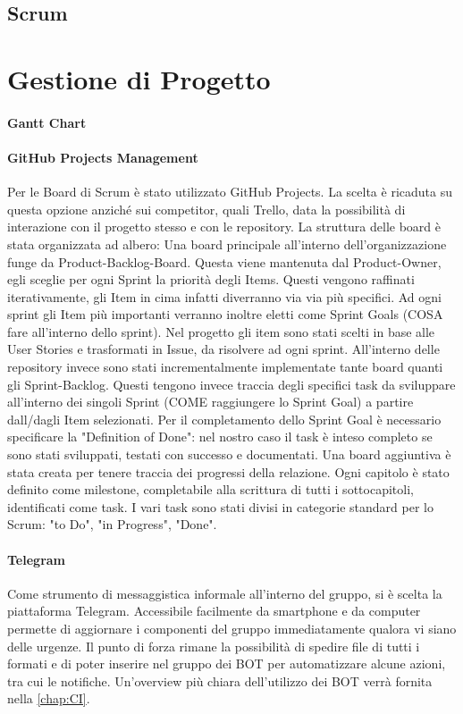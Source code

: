     \subsection{Scrum}

\section{Gestione di Progetto}

    \paragraph{Gantt Chart}
    
    \paragraph{GitHub Projects Management}
    Per le Board di Scrum è stato utilizzato GitHub Projects. La scelta è ricaduta su questa opzione anziché sui competitor, quali Trello, data la possibilità di interazione con il progetto stesso e con le repository. 
    La struttura delle board è stata organizzata ad albero:
    Una board principale all'interno dell'organizzazione funge da Product-Backlog-Board. Questa viene mantenuta dal Product-Owner, egli sceglie per ogni Sprint la priorità degli Items. Questi vengono raffinati iterativamente, gli Item in cima infatti diverranno via via più specifici. Ad ogni sprint gli Item più importanti verranno inoltre eletti come Sprint Goals (COSA fare all'interno dello sprint). 
    Nel progetto gli item sono stati scelti in base alle User Stories e trasformati in Issue, da risolvere ad ogni sprint.
    All'interno delle repository invece sono stati incrementalmente implementate tante board quanti gli Sprint-Backlog. Questi tengono invece traccia degli specifici task da sviluppare all'interno dei singoli Sprint (COME raggiungere lo Sprint Goal) a partire dall/dagli Item selezionati. 
    Per il completamento dello Sprint Goal è necessario specificare la "Definition of Done": nel nostro caso il task è inteso completo se sono stati sviluppati, testati con successo e documentati.
    Una board aggiuntiva è stata creata per tenere traccia dei progressi della relazione. Ogni capitolo è stato definito come milestone, completabile alla scrittura di tutti i sottocapitoli, identificati come task.
    I vari task sono stati divisi in categorie standard per lo Scrum: "to Do", "in Progress", "Done".
    
    \paragraph{Telegram}
    Come strumento di messaggistica informale all'interno del gruppo, si è scelta la piattaforma Telegram. Accessibile facilmente da smartphone e da computer permette di aggiornare i componenti del gruppo immediatamente qualora vi siano delle urgenze. Il punto di forza rimane la  possibilità di spedire file di tutti i formati e di poter inserire nel gruppo dei BOT per automatizzare alcune azioni, tra cui le notifiche. Un'overview più chiara dell'utilizzo dei BOT verrà fornita nella \autoref{chap:CI}.
    

